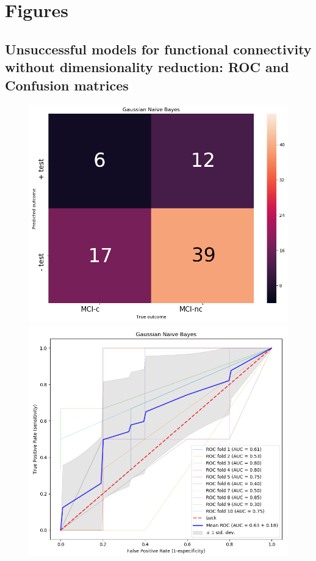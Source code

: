 		
		
\section{Figures}

	\subsection{Unsuccessful models for functional connectivity without dimensionality reduction: ROC and Confusion matrices}\label{sec:fig_NaiveBayes_fMRI_nodimreduc_CONFUSIONiROCCURVE}

	
	\FloatBarrier
	\begin{figure}[h]
		\centering
		\begin{minipage}{.5\textwidth}
			\centering
			\includegraphics[width=1\linewidth]{fig_GNB_fmri_nodimreduc_CONFUSION.png}
		\end{minipage}%
		\begin{minipage}{.5\textwidth}
			\centering
			\includegraphics[width=1\linewidth]{fig_GNB_fmri_nodimreduc_ROC.png}

\end{minipage}
\end{figure}

